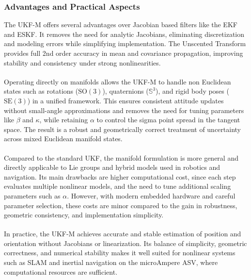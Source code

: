 \subsubsection{Advantages and Practical Aspects}
The UKF-M offers several advantages over Jacobian based filters like the EKF and ESKF. It removes the need for analytic Jacobians, eliminating discretization and modeling errors while simplifying implementation. The Unscented Transform provides full 2nd order accuracy in mean and covariance propagation, improving stability and consistency under strong nonlinearities.
\\ \\
Operating directly on manifolds allows the UKF-M to handle non Euclidean states such as rotations ($\mathrm{SO}(3)$), quaternions ($\mathbb{S}^3$), and rigid body poses ($\mathrm{SE}(3)$) in a unified framework. This ensures consistent attitude updates without small-angle approximations and removes the need for tuning parameters like $\beta$ and $\kappa$, while retaining $\alpha$ to control the sigma point spread in the tangent space. The result is a robust and geometrically correct treatment of uncertainty across mixed Euclidean manifold states.
\\ \\
Compared to the standard UKF, the manifold formulation is more general and directly applicable to Lie groups and hybrid models used in robotics and navigation. Its main drawbacks are higher computational cost, since each step evaluates multiple nonlinear models, and the need to tune additional scaling parameters such as $\alpha$. However, with modern embedded hardware and careful parameter selection, these costs are minor compared to the gain in robustness, geometric consistency, and implementation simplicity.
\\ \\
In practice, the UKF-M achieves accurate and stable estimation of position and orientation without Jacobians or linearization. Its balance of simplicity, geometric correctness, and numerical stability makes it well suited for nonlinear systems such as SLAM and inertial navigation on the microAmpere ASV, where computational resources are sufficient.
